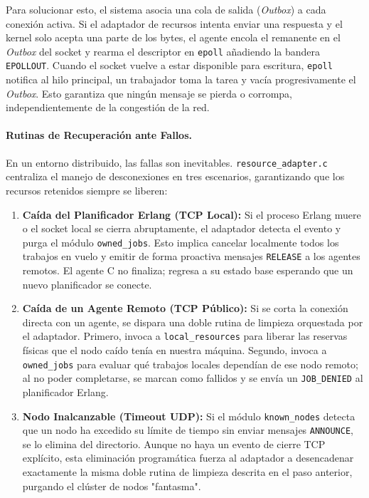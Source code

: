 \documentclass[12pt,a4paper]{article}
\begin{document}
Para solucionar esto, el sistema asocia una cola de salida (\emph{Outbox}) a cada conexión activa. Si el adaptador de recursos intenta enviar una respuesta y el kernel solo acepta una parte de los bytes, el agente encola el remanente en el \emph{Outbox} del socket y rearma el descriptor en \texttt{epoll} añadiendo la bandera \texttt{EPOLLOUT}. Cuando el socket vuelve a estar disponible para escritura, \texttt{epoll} notifica al hilo principal, un trabajador toma la tarea y vacía progresivamente el \emph{Outbox}. Esto garantiza que ningún mensaje se pierda o corrompa, independientemente de la congestión de la red.

\paragraph{Rutinas de Recuperación ante Fallos.}
En un entorno distribuido, las fallas son inevitables. \texttt{resource\_adapter.c} centraliza el manejo de desconexiones en tres escenarios, garantizando que los recursos retenidos siempre se liberen:

\begin{enumerate}
    \item \textbf{Caída del Planificador Erlang (TCP Local):} Si el proceso Erlang muere o el socket local se cierra abruptamente, el adaptador detecta el evento y purga el módulo \texttt{owned\_jobs}. Esto implica cancelar localmente todos los trabajos en vuelo y emitir de forma proactiva mensajes \texttt{RELEASE} a los agentes remotos. El agente C no finaliza; regresa a su estado base esperando que un nuevo planificador se conecte.
    \item \textbf{Caída de un Agente Remoto (TCP Público):} Si se corta la conexión directa con un agente, se dispara una doble rutina de limpieza orquestada por el adaptador. Primero, invoca a \texttt{local\_resources} para liberar las reservas físicas que el nodo caído tenía en nuestra máquina. Segundo, invoca a \texttt{owned\_jobs} para evaluar qué trabajos locales dependían de ese nodo remoto; al no poder completarse, se marcan como fallidos y se envía un \texttt{JOB\_DENIED} al planificador Erlang.
    \item \textbf{Nodo Inalcanzable (Timeout UDP):} Si el módulo \texttt{known\_nodes} detecta que un nodo ha excedido su límite de tiempo sin enviar mensajes \texttt{ANNOUNCE}, se lo elimina del directorio. Aunque no haya un evento de cierre TCP explícito, esta eliminación programática fuerza al adaptador a desencadenar exactamente la misma doble rutina de limpieza descrita en el paso anterior, purgando el clúster de nodos "fantasma".
\end{enumerate}
\end{document}
